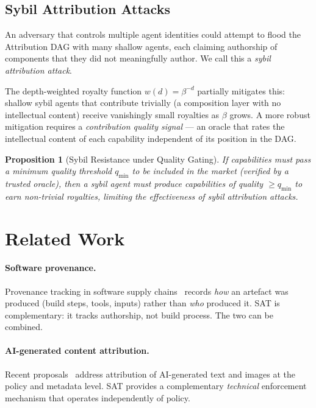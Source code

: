 \documentclass[12pt]{article}
\newtheorem{proposition}[theorem]{Proposition}
\begin{document}
\subsection{Sybil Attribution Attacks}

An adversary that controls multiple agent identities could attempt to flood the
Attribution DAG with many shallow agents, each claiming authorship of components
that they did not meaningfully author.  We call this a \emph{sybil attribution
attack}.

The depth-weighted royalty function $w(d) = \beta^{-d}$ partially mitigates
this: shallow sybil agents that contribute trivially (a composition layer with
no intellectual content) receive vanishingly small royalties as $\beta$ grows.
A more robust mitigation requires a \emph{contribution quality signal} — an
oracle that rates the intellectual content of each capability independent of its
position in the DAG.

\begin{proposition}[Sybil Resistance under Quality Gating]
  If capabilities must pass a minimum quality threshold $q_\text{min}$ to be
  included in the market (verified by a trusted oracle), then a sybil agent
  must produce capabilities of quality $\ge q_\text{min}$ to earn non-trivial
  royalties, limiting the effectiveness of sybil attribution attacks.
\end{proposition}

\section{Related Work}
\label{sec:related}

\paragraph{Software provenance.}
Provenance tracking in software supply chains~\cite{sigstore2021, in-toto2019}
records \emph{how} an artefact was produced (build steps, tools, inputs) rather
than \emph{who} produced it.  SAT is complementary: it tracks authorship, not
build process.  The two can be combined.

\paragraph{AI-generated content attribution.}
Recent proposals~\cite{bender2021, bommasani2021} address attribution of
AI-generated text and images at the policy and metadata level.  SAT provides
a complementary \emph{technical} enforcement mechanism that operates
independently of policy.
\end{document}
